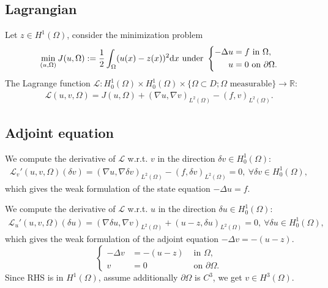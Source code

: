 \documentclass[oneside,11pt]{book}
\numberwithin{equation}{section}
\begin{document}
\subsection{Lagrangian}
Let $z\in H^1(\Omega)$, consider the minimization problem
\begin{equation}
    \label{minimization problem}
    \min_{(u,\Omega)} J(u,\Omega) := \frac{1}{2}\int_\Omega (u(x) - z(x))^2{\rm d}x \mbox{ under } \left\{\begin{split}
        -\Delta u &= f \mbox{ in } \Omega,\\
        u &= 0 \mbox{ on } \partial\Omega.
    \end{split}\right.
\end{equation}
The Lagrange function $\mathcal{L}:H_0^1(\Omega)\times H_0^1(\Omega)\times \{\Omega\subset D;\Omega \mbox{ measurable}\}\to\mathbb{R}$:
\begin{align}
    \label{Lagrangian}
    \mathcal{L}(u,v,\Omega) = J(u,\Omega) + (\nabla u,\nabla v)_{L^2(\Omega)} - (f,v)_{L^2(\Omega)}.
\end{align}

\subsection{Adjoint equation}
We compute the derivative of $\mathcal{L}$ w.r.t. $v$ in the direction $\delta v\in H_0^1(\Omega)$:
\begin{align}
    \mathcal{L}_v'(u,v,\Omega)(\delta v) = (\nabla u,\nabla\delta v)_{L^2(\Omega)} - (f,\delta v)_{L^2(\Omega)} = 0,\ \forall\delta v\in H_0^1(\Omega),
\end{align}
which gives the weak formulation of the state equation $-\Delta u = f$.

We compute the derivative of $\mathcal{L}$ w.r.t. $u$ in the direction $\delta u\in H_0^1(\Omega)$:
\begin{align}
    \mathcal{L}_u'(u,v,\Omega)(\delta u) = (\nabla\delta u,\nabla v)_{L^2(\Omega)} + (u - z,\delta u)_{L^2(\Omega)} = 0,\ \forall\delta u\in H_0^1(\Omega),
\end{align}
which gives the weak formulation of the adjoint equation $-\Delta v = -(u - z)$.
\begin{equation}
    \label{Schmidt2020 (4.23)}
    \left\{\begin{split}
        -\Delta v &= -(u - z) &\mbox{ in } \Omega,\\
        v &= 0 &\mbox{ on } \partial\Omega.
    \end{split}\right.
\end{equation}
Since RHS is in $H^1(\Omega)$, assume additionally $\partial\Omega$ is $C^3$, we get $v\in H^3(\Omega)$.
\end{document}
